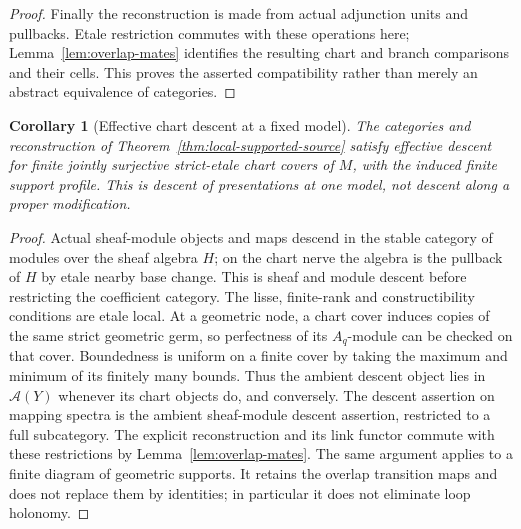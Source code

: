 \documentclass[11pt]{article}
\newtheorem{corollary}[theorem]{Corollary}
\theoremstyle{definition}
\theoremstyle{remark}
\begin{document}
\begin{proof}
Finally the reconstruction is made from actual adjunction units and
pullbacks.  Etale restriction commutes with these operations here;
Lemma~\ref{lem:overlap-mates} identifies the resulting chart and
branch comparisons and their cells.  This proves the asserted
compatibility rather than merely an abstract equivalence of categories.
\end{proof}

\begin{corollary}[Effective chart descent at a fixed model]
\label{cor:fixed-model-etale-descent}
The categories and reconstruction of
Theorem~\ref{thm:local-supported-source} satisfy effective descent
for finite jointly surjective strict-etale chart covers of $M$,
with the induced finite support profile.  This is descent of
presentations at one model, not descent along a proper modification.
\end{corollary}
\begin{proof}
Actual sheaf-module objects and maps descend in the stable category
of modules over the sheaf algebra $H$; on the chart nerve the algebra
is the pullback of $H$ by etale nearby base change.  This is sheaf
and module descent before restricting the coefficient category.
The lisse, finite-rank and constructibility conditions are etale local.
At a geometric node, a chart cover induces copies of the same strict
geometric germ, so perfectness of its $A_q$-module can be checked
on that cover.  Boundedness is uniform on a finite cover by taking
the maximum and minimum of its finitely many bounds.  Thus the
ambient descent object lies in $\mathcal A(Y)$ whenever its chart
objects do, and conversely.  The descent assertion on mapping spectra
is the ambient sheaf-module descent assertion, restricted to a full
subcategory.  The explicit reconstruction and its link functor
commute with these restrictions by Lemma~\ref{lem:overlap-mates}.
The same argument applies to a finite diagram of geometric supports.
It retains the overlap transition maps and does not replace them
by identities; in particular it does not eliminate loop holonomy.
\end{proof}
\end{document}
